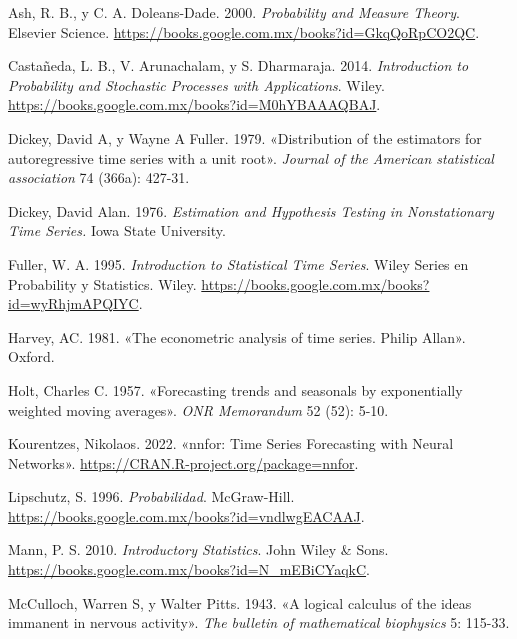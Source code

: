 \documentclass[
  us-letterpaper,
]{scrreprt}
\newlength{\cslhangindent}
\newenvironment{CSLReferences}[2] %
 {\begin{list}{}{%
  \setlength{\itemindent}{0pt}
  \setlength{\leftmargin}{0pt}
  \setlength{\parsep}{0pt}
  \ifodd #1
   \setlength{\leftmargin}{\cslhangindent}
   \setlength{\itemindent}{-1\cslhangindent}
  \fi
  \setlength{\itemsep}{#2\baselineskip}}}
 {\end{list}}
\theoremstyle{plain}
\theoremstyle{definition}
\theoremstyle{plain}
\theoremstyle{definition}
\theoremstyle{remark}
\begin{document}
\label{refs}
\begin{CSLReferences}{1}{0}
Ash, R. B., y C. A. Doleans-Dade. 2000. \emph{Probability and Measure
Theory}. Elsevier Science.
\url{https://books.google.com.mx/books?id=GkqQoRpCO2QC}.

Castañeda, L. B., V. Arunachalam, y S. Dharmaraja. 2014.
\emph{Introduction to Probability and Stochastic Processes with
Applications}. Wiley.
\url{https://books.google.com.mx/books?id=M0hYBAAAQBAJ}.

Dickey, David A, y Wayne A Fuller. 1979. {«Distribution of the
estimators for autoregressive time series with a unit root»}.
\emph{Journal of the American statistical association} 74 (366a):
427-31.

Dickey, David Alan. 1976. \emph{Estimation and Hypothesis Testing in
Nonstationary Time Series.} Iowa State University.

Fuller, W. A. 1995. \emph{Introduction to Statistical Time Series}.
Wiley Series en Probability y Statistics. Wiley.
\url{https://books.google.com.mx/books?id=wyRhjmAPQIYC}.

Harvey, AC. 1981. {«The econometric analysis of time series. Philip
Allan»}. Oxford.

Holt, Charles C. 1957. {«Forecasting trends and seasonals by
exponentially weighted moving averages»}. \emph{ONR Memorandum} 52 (52):
5-10.

Kourentzes, Nikolaos. 2022. {«nnfor: Time Series Forecasting with Neural
Networks»}. \url{https://CRAN.R-project.org/package=nnfor}.

Lipschutz, S. 1996. \emph{Probabilidad}. McGraw-Hill.
\url{https://books.google.com.mx/books?id=vndlwgEACAAJ}.

Mann, P. S. 2010. \emph{Introductory Statistics}. John Wiley \& Sons.
\url{https://books.google.com.mx/books?id=N_mEBiCYaqkC}.

McCulloch, Warren S, y Walter Pitts. 1943. {«A logical calculus of the
ideas immanent in nervous activity»}. \emph{The bulletin of mathematical
biophysics} 5: 115-33.


\end{CSLReferences}
\end{document}
